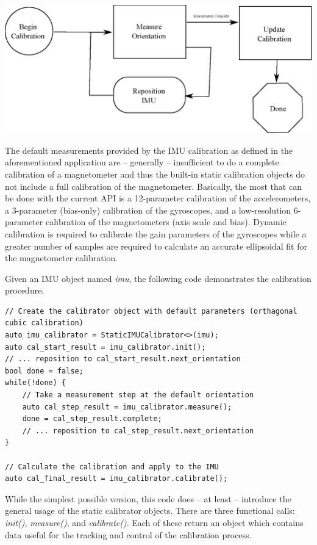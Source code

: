 \documentclass[10pt,letterpaper]{memoir} %
\begin{document}
\includegraphics{imu_calibration_flow.eps}

The default measurements provided by the IMU calibration as defined in the aforementioned application are -- generally -- insufficient to do a complete calibration of a magnetometer and thus the built-in static calibration objects do not include a full calibration of the magnetometer.  Basically, the most that can be done with the current API is a 12-parameter calibration of the accelerometers, a 3-parameter (bias-only) calibration of the gyroscopes, and a low-resolution 6-parameter calibration of the magnetometers (axis scale and bias).  Dynamic calibration is required to calibrate the gain parameters of the gyroscopes while a greater number of samples are required to calculate an accurate ellipsoidal fit for the magnetometer calibration.

Given an IMU object named \emph{imu}, the following code demonstrates the calibration procedure.
\begin{verbatim}
// Create the calibrator object with default parameters (orthagonal cubic calibration)
auto imu_calibrator = StaticIMUCalibrator<>(imu);
auto cal_start_result = imu_calibrator.init();
// ... reposition to cal_start_result.next_orientation
bool done = false;
while(!done) {
	// Take a measurement step at the default orientation
	auto cal_step_result = imu_calibrator.measure();
	done = cal_step_result.complete;
	// ... reposition to cal_step_result.next_orientation
}

// Calculate the calibration and apply to the IMU
auto cal_final_result = imu_calibrator.calibrate();
\end{verbatim} 
While the simplest possible version, this code does -- at least -- introduce the general usage of the static calibrator objects.  There are three functional calls: \emph{init()}, \emph{measure()}, and \emph{calibrate()}.  Each of these return an object which contains data useful for the tracking and control of the calibration process.  
\end{document}
